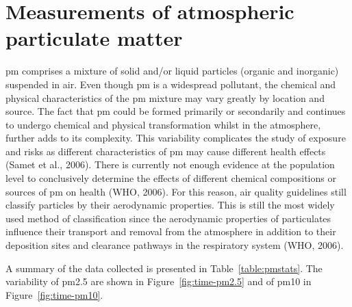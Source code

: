 \documentclass{nwureport}
\begin{document}
\section{Measurements of atmospheric particulate matter}

\gls{pm} comprises a mixture of solid and/or liquid particles (organic and inorganic) suspended in air. Even though \gls{pm} is a widespread pollutant, the chemical and physical characteristics of the \gls{pm} mixture may vary greatly by location and source. The fact that \gls{pm} could be formed primarily or secondarily and continues to undergo chemical and physical transformation whilst in the atmosphere, further adds to its complexity. This variability complicates the study of exposure and risks as different characteristics of \gls{pm} may cause different health effects (Samet et al., 2006). There is currently not enough evidence at the population level to conclusively determine the effects of different chemical compositions or sources of \gls{pm} on health (WHO, 2006). For this reason, air quality guidelines still classify particles by their aerodynamic properties. This is still the most widely used method of classification since the aerodynamic properties of particulates influence their transport and removal from the atmosphere in addition to their deposition sites and clearance pathways in the respiratory system (WHO, 2006).

A summary of the data collected is presented in Table~\ref{table:pmstats}. The variability of \gls{pm2.5} are shown in Figure~\ref{fig:time-pm2.5} and of \gls{pm10} in Figure~\ref{fig:time-pm10}.
\end{document}

